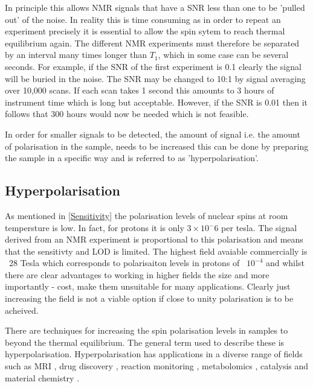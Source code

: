   In principle this allows NMR signals that have a SNR less than one to be 'pulled out' of the noise. In reality this is
  time consuming as in order to repeat an experiment precisely it is essential to allow the spin sytem to
  reach thermal equilibrium again. The different NMR experiments must therefore be separated by an interval
  many times longer than $T_1$, which in some case can be several seconds. For example, if the SNR of the first
  experiment is 0.1 clearly the signal will be buried in the noise. The SNR may be changed to 10:1 by signal averaging
  over 10,000 scans. If each scan takes 1 second this amounts to 3 hours of instrument time which is long but
  acceptable. However, if the SNR is 0.01 then it follows that 300 hours would now be needed which is not feasible.

  In order for smaller signals to be detected, the amount of signal i.e. the amount of polarisation in the sample,
  needs to be increased this can be done by preparing the sample in a specific way and is referred to as
  'hyperpolarisation'.

\subsection{Hyperpolarisation}

 As mentioned in \ref{Sensitivity} the polarisation levels of nuclear spins at room tempersture is low. In fact,
 for protons it is only $3\times10{^-6}$ per tesla\citep{RN138}. The signal derived from an NMR experiment
 is proportional to this polarisation and means that the sensitivty and LOD is limited. The highest
 field avaiable commercially is ~28 Tesla which corresponds to polarisaiton levels in protons of ~$10^{-4}$ and
 whilst there are clear advantages to working in higher fields the size and more importantly - cost, make them unsuitable for many applications. Clearly just increasing the field is not a viable
 option if close to unity polarisation is to be
 acheived.

 There are techniques for increasing the spin polarisation levels in samples to beyond the thermal
 equilibrium. The general term used to describe these is hyperpolarisation. Hyperpolarisation has
 applications in a diverse range of fields such as MRI \citep{RN139,RN140,RN151,RN152}, drug discovery
 \citep{RN141,RN142}, reaction monitoring \citep{RN143,RN144,RN145}, metabolomics \citep{RN147,RN148},
 catalysis\citep{RN149, RN150} and material chemistry \citep{RN153,piveteau2015structure,RN154}.

